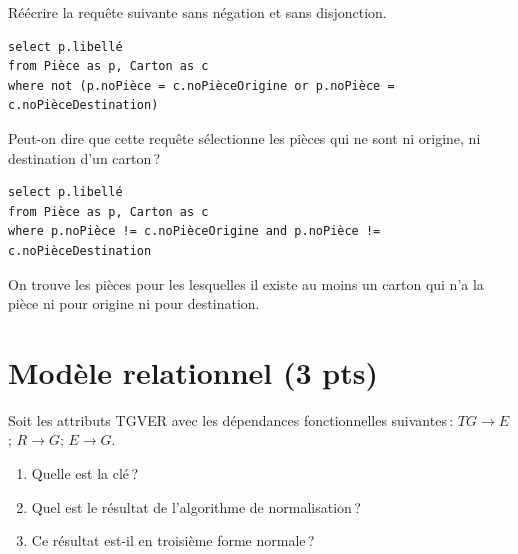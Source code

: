 Réécrire la requête suivante sans négation et sans disjonction.


\begin{verbatim}
select p.libellé
from Pièce as p, Carton as c
where not (p.noPièce = c.noPièceOrigine or p.noPièce = c.noPièceDestination)
\end{verbatim}

Peut-on dire que cette requête sélectionne les pièces qui ne sont ni origine, ni destination 
d'un carton\,?

\begin{solution}

\begin{verbatim}
select p.libellé
from Pièce as p, Carton as c
where p.noPièce != c.noPièceOrigine and p.noPièce != c.noPièceDestination
\end{verbatim}

On trouve les pièces pour les lesquelles il existe au moins un carton 
qui n'a la pièce ni pour origine ni pour destination.
\end{solution}


\section{Modèle relationnel ({\bf 3 pts})}

Soit les attributs TGVER avec les dépendances fonctionnelles suivantes\,:
$TG \to E$; $R \to G$; $E \to G$.

\begin{enumerate}
  \item Quelle est la clé\,?
  \item Quel est le résultat de l'algorithme de normalisation\,?
  \item Ce résultat est-il en troisième forme normale\,?
\end{enumerate}